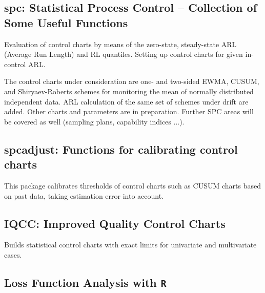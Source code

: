 \documentclass[]{article}
\begin{document}
\subsection{\textbf{spc}: Statistical Process Control – Collection of Some Useful Functions}

Evaluation of control charts by means of the zero-state, steady-state ARL (Average Run Length) and RL quantiles. Setting up control charts for given in-control ARL. 

The control charts under consideration are one- and two-sided EWMA, CUSUM, and Shiryaev-Roberts schemes for monitoring the mean of normally distributed independent data. ARL calculation of the same set of schemes under drift are added. Other charts and parameters are in preparation. Further SPC areas will be covered as well (sampling plans, capability indices ...).

\subsection{\textbf{spcadjust}: Functions for calibrating control charts}

This package calibrates thresholds of control charts such as CUSUM charts based on past data, taking estimation error into account.

\subsection{ \textbf{IQCC}: Improved Quality Control Charts}

Builds statistical control charts with exact limits for univariate and multivariate cases.
\subsection{Loss Function Analysis with \texttt{R}}
\end{document}
